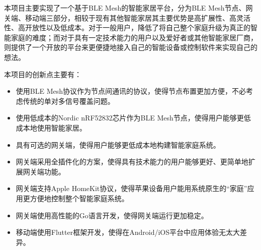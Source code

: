 \begin{cabstract}
  本项目主要实现了一个基于BLE Mesh的智能家居平台，分为BLE Mesh节点、网关端、移动端三部分，相较于现有其他智能家居其主要优势是高扩展性、高灵活性、高开放性以及低成本。对于一般用户，降低了将自己整个家庭升级为真正的智能家庭的难度；而对于具有一定技术能力的用户以及爱好者或其他智能家居厂商，则提供了一个开放的平台来更便捷地接入自己的智能设备或控制软件来实现自己的想法。

  本项目的创新点主要有：
  \begin{itemize}
    \item 使用BLE Mesh协议作为节点间通讯的协议，使得节点布置更加方便，不必考虑传统的单对多信号覆盖问题。
    \item 使用低成本的Nordic nRF52832芯片作为BLE Mesh节点，使得用户能够更低成本地使用智能家居。
    \item 具有可选的网关端，使得用户能够更低成本地构建智能家庭系统。
    \item 网关端采用全插件化的方案，使得具有技术能力的用户能够更好、更简单地扩展网关端功能。
    \item 网关端支持Apple HomeKit协议，使得苹果设备用户能用系统原生的“家庭”应用更方便地控制整个智能家庭系统。
    \item 网关端使用高性能的Go语言开发，使得网关端运行更加稳定。
    \item 移动端使用Flutter框架开发，使得在Android/iOS平台中应用体验无太大差异。
  \end{itemize}
\end{cabstract}





